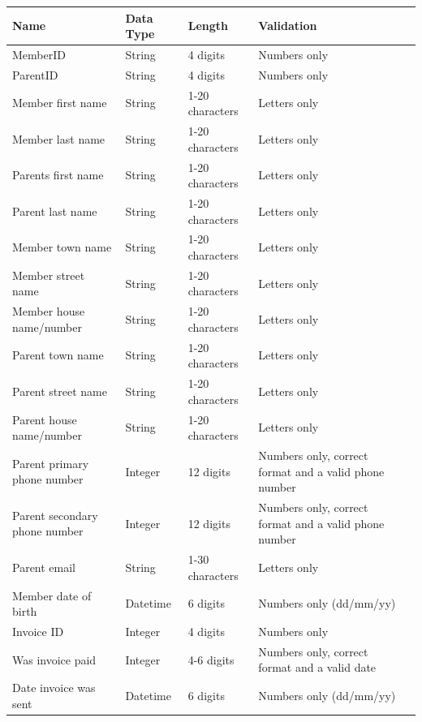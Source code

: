 \newpage
\begin{center}
\begin{tabular}{|p{2cm}|p{2cm}|p{2cm}|p{2cm}|l}
\hline
\textbf{Name}                    & \textbf{Data Type}    & \textbf{Length}                  & \textbf{Validation} \\ \hline
MemberID                           & String            & 4 digits                & Numbers only \\ \hline
ParentID                             & String            & 4 digits                & Numbers only \\ \hline
Member first name              & String            & 1-20 characters   & Letters only \\ \hline
Member last name               & String           &1-20 characters &  Letters only \\ \hline
Parents first name               & String           & 1-20 characters &  Letters only \\ \hline
Parent last name                 & String           & 1-20 characters &  Letters only \\ \hline
Member town name                 & String           & 1-20 characters &  Letters only \\ \hline
Member street name                 & String           & 1-20 characters &  Letters only \\ \hline
Member house name/number & String              & 1-20 characters &  Letters only \\ \hline
Parent town name                 & String           & 1-20 characters &  Letters only \\ \hline
Parent street name                 & String           & 1-20 characters &  Letters only \\ \hline
Parent house name/number & String                 & 1-20 characters &  Letters only \\ \hline
Parent primary phone number         & Integer        & 12 digits & Numbers only, correct format and a valid phone number \\ \hline
Parent secondary phone number         & Integer        & 12 digits & Numbers only, correct format and a valid phone number \\ \hline
Parent email                        & String          & 1-30 characters &  Letters only \\ \hline
Member date of birth          & Datetime       & 6 digits & Numbers only (dd/mm/yy) \\ \hline
Invoice ID                           & Integer       & 4 digits & Numbers only \\ \hline
Was invoice paid                 & Integer       & 4-6 digits & Numbers only, correct format and a valid date \\ \hline
Date invoice was sent        & Datetime       & 6 digits & Numbers only (dd/mm/yy) \\ \hline
\end{tabular}
\end{center}


